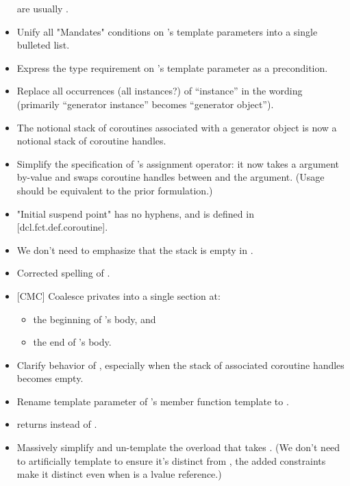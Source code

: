 \documentclass{wg21}
\begin{document}
\begin{itemize}
  are usually .
\item Unify all "Mandates" conditions on 's template parameters
  into a single bulleted list.
\item Express the type requirement on 's 
  template parameter as a precondition.
\item Replace all occurrences (all instances?) of ``instance'' in the wording
  (primarily ``generator instance'' becomes ``generator object'').
\item The notional stack of coroutines
  associated with a generator object
  is now a notional stack of coroutine handles.
\item Simplify the specification of 's assignment operator:
  it now takes a  argument by-value and swaps coroutine handles
  between  and the argument. (Usage should be equivalent to the
  prior formulation.)
\item "Initial suspend point" has no hyphens, and
  is defined in [dcl.fct.def.coroutine].
\item We don't need to emphasize that the stack is empty in .
\item Corrected spelling of .
\item{} [CMC] Coalesce privates into a single section at:
  \begin{itemize}
    \item the beginning of 's body, and
    \item the end of 's body.
  \end{itemize}
\item Clarify behavior of , especially when
  the stack of associated coroutine handles becomes empty.
\item Rename template parameter  of 's
   member function template to .
\item {} returns  instead of
  .
\item Massively simplify and un-template the  overload that
  takes . (We don't need to
  artificially template to ensure it's distinct from
  , the added constraints make it distinct
  even when  is a  lvalue reference.)

\end{itemize}
\end{document}
